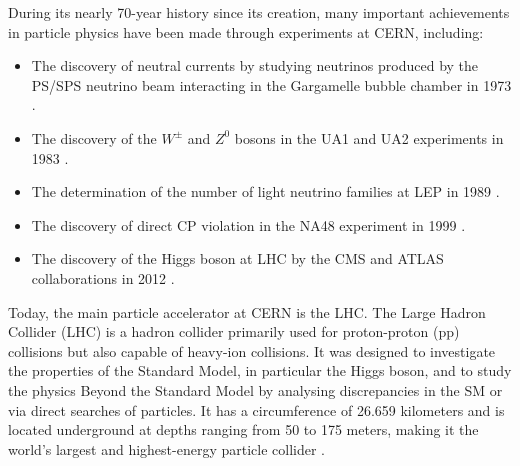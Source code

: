 During its nearly 70-year history since its creation, many important achievements in particle physics have been made through experiments at CERN, including:
\begin{itemize}
    \setlength\itemsep{0em}
    \item The discovery of neutral currents by studying neutrinos produced by the PS/SPS neutrino beam interacting in the Gargamelle bubble chamber in 1973 \cite{GargamelleNeutrino:1973jyy}.
    \item The discovery of the $W^\pm$ and $Z^0$ bosons in the UA1 and UA2 experiments in 1983 \cite{UA1:1983crd, UA2:1983tsx}.
    \item The determination of the number of light neutrino families at LEP in 1989 \cite{ALEPH:1989kcj}.
    \item The discovery of direct CP violation in the NA48 experiment in 1999 \cite{NA48:1999szy}.
    \item The discovery of the Higgs boson at LHC by the CMS and ATLAS collaborations in 2012 \cite{CMS:2012qbp,ATLAS:2012yve}.
\end{itemize}

Today, the main particle accelerator at CERN is the LHC. The Large Hadron Collider (LHC) is a hadron collider primarily used for proton-proton (pp) collisions but also capable of heavy-ion collisions. It was designed to investigate the properties of the Standard Model, in particular the Higgs boson, and to study the physics Beyond the Standard Model by analysing discrepancies in the SM or via direct searches of particles. It has a circumference of 26.659 kilometers and is located underground at depths ranging from 50 to 175 meters, making it the world's largest and highest-energy particle collider \cite{Evans:2008zzb, CERN:Facts_figures}.

